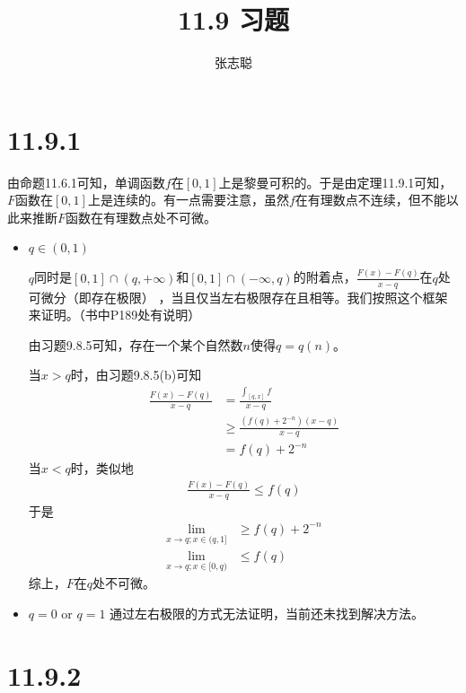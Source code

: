 \documentclass{article}
\begin{document}
\title{11.9 习题}
\author{张志聪}
\maketitle

\section*{11.9.1}

由命题11.6.1可知，单调函数$f$在$[0, 1]$上是黎曼可积的。于是由定理11.9.1可知，
$F$函数在$[0, 1]$上是连续的。有一点需要注意，虽然$f$在有理数点不连续，但不能以此来推断$F$函数在有理数点处不可微。

\begin{itemize}
  \item $q \in (0, 1)$

        $q$同时是$[0, 1] \cap (q, +\infty)$和$[0, 1] \cap (-\infty, q)$的附着点，$\frac{F(x) - F(q)}{x - q}$在$q$处可微分（即存在极限）
        ，当且仅当左右极限存在且相等。我们按照这个框架来证明。（书中P189处有说明）

        由习题9.8.5可知，存在一个某个自然数$n$使得$q = q(n)$。

        当$x > q$时，由习题9.8.5(b)可知
        \begin{align*}
          \frac{F(x) - F(q)}{x - q} & = \frac{\int_{[q, x]} f}{x - q}                  \\
                                    & \geq \frac{\left(f(q) + 2^{-n}\right)(x-q)}{x-q} \\
                                    & = f(q) + 2^{-n}
        \end{align*}
        当$x < q$时，类似地
        \begin{align*}
          \frac{F(x) - F(q)}{x - q} \leq f(q)
        \end{align*}
        于是
        \begin{align*}
          \lim\limits_{x \to q; x \in (q, 1]} & \geq f(q) + 2^{-n} \\
          \lim\limits_{x \to q; x \in [0, q)} & \leq f(q)
        \end{align*}
        综上，$F$在$q$处不可微。
  \item $q = 0$ or $q = 1$
        通过左右极限的方式无法证明，当前还未找到解决方法。
\end{itemize}

\section*{11.9.2}
\end{document}
